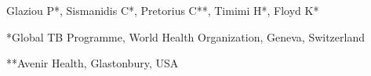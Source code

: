 Glaziou P*, Sismanidis C*, Pretorius C**, Timimi H*, Floyd K*

*Global TB Programme, World Health Organization, Geneva, Switzerland

**Avenir Health, Glastonbury, USA